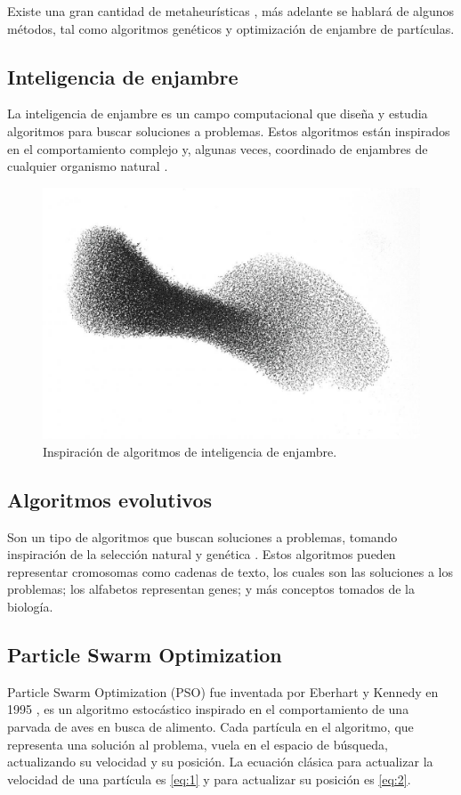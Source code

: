  Existe una gran cantidad de metaheurísticas
  \cite{HeuristicDef, SearchMethodologies}, más adelante se hablará de algunos
  métodos, tal como algoritmos genéticos y optimización de enjambre de
  partículas.

\subsection{Inteligencia de enjambre}
  La inteligencia de enjambre es un campo computacional que diseña y estudia
  algoritmos para buscar soluciones a problemas. Estos algoritmos están 
  inspirados en el comportamiento complejo y, algunas veces, coordinado de
  enjambres de cualquier organismo natural \cite{SearchMethodologies}. 
  
  \begin{figure}[ht!]
    \includegraphics[scale=0.18]{si-repr}
    \centering
    \caption{Inspiración de algoritmos de inteligencia de enjambre.}
    \centering
  \end{figure}

\subsection{Algoritmos evolutivos}
  Son un tipo de algoritmos que buscan soluciones a problemas, tomando
  inspiración de la selección natural y genética \cite{EADef,GADef}. Estos 
  algoritmos pueden representar cromosomas como cadenas de texto, los cuales 
  son las soluciones a los problemas; los alfabetos representan genes; y más
  conceptos tomados de la biología.

\subsection{Particle Swarm Optimization}\label{subsec:pso}
  Particle Swarm Optimization (PSO) fue inventada por Eberhart y Kennedy en
  1995 \cite{PSODef}, es un algoritmo
  estocástico inspirado en el comportamiento de una parvada de aves en busca
  de alimento. Cada partícula en el algoritmo, que representa una solución al
  problema, vuela en el espacio de búsqueda, actualizando su velocidad y su
  posición. La ecuación clásica para actualizar la velocidad de una partícula
  es \ref{eq:1} y para actualizar su posición es \ref{eq:2}.

